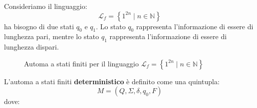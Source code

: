 \documentclass[a4paper]{article}
\begin{document}
\vspace{1em}
\noindent
Consideriamo il linguaggio:
\[
\mathcal{L}_f = \left\{ 1^{2n} \;\left|\; n \in \mathbb{N} \right. \right\}
\] 
ha bisogno di due stati \( q_0 \) e \( q_1 \). Lo stato \( q_0 \) rappresenta
l'informazione di essere di lunghezza pari, mentre lo stato \( q_1 \)
rappresenta l'informazione di essere di lunghezza dispari.
\begin{figure}[H]
  \centering
  \caption{Automa a stati finiti per il linguaggio \( \mathcal{L}_f = \left\{ 1^{2n} \;\left|\; n
            \in \mathbb{N} \right. \right\} \)}
\end{figure}
L'automa a stati finiti \textbf{deterministico} è definito come una quintupla: 
\[
  M = \left( Q, \Sigma , \delta, q_0, F \right) 
\] 
dove:
\end{document}
